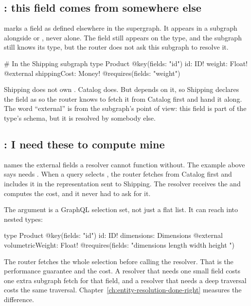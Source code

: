 \subsection*{: this field comes from somewhere else}

%
 marks a field as defined elsewhere in the supergraph. It
appears in a subgraph alongside  or , never
alone. The field still appears on the type, and the subgraph still knows its
type, but the router does not ask this subgraph to resolve it.

\begin{graphqlsdl}
# In the Shipping subgraph
type Product @key(fields: "id") {
  id: ID!
  weight: Float! @external
  shippingCost: Money! @requires(fields: "weight")
}
\end{graphqlsdl}

Shipping does not own . Catalog does. But 
depends on it, so Shipping declares the field as  so the router
knows to fetch it from Catalog first and hand it along. The word
\enquote{external} is from the subgraph's point of view: this field is part of
the type's schema, but it is resolved by somebody else.

\subsection*{: I need these to compute mine}

%
 names the external fields a resolver cannot function without.
The example above says  needs . When a query
selects , the router fetches  from Catalog first
and includes it in the representation sent to Shipping. The resolver receives
the  and computes the cost, and it never had to ask for it.

The  argument is a GraphQL selection set, not just a flat list. It
can reach into nested types:

\begin{graphqlsdl}
type Product @key(fields: "id") {
  id: ID!
  dimensions: Dimensions @external
  volumetricWeight: Float! @requires(fields: "dimensions { length width height }")
}
\end{graphqlsdl}

%
The router fetches the whole selection before calling the resolver. That is the
performance guarantee and the cost. A resolver that needs one small field costs
one extra subgraph fetch for that field, and a resolver that needs a deep
traversal costs the same traversal. Chapter~\ref{ch:entity-resolution-done-right}
measures the difference.

